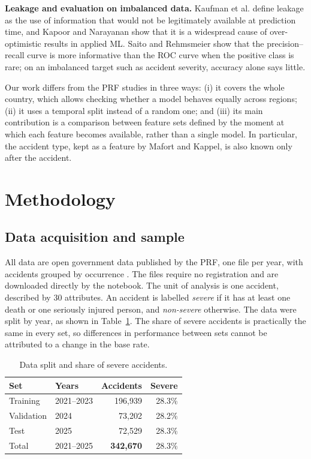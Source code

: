 \documentclass[12pt]{article}
\begin{document}
\textbf{Leakage and evaluation on imbalanced data.} Kaufman et al.
\cite{kaufman2012} define leakage as the use of information that would not be
legitimately available at prediction time, and Kapoor and Narayanan
\cite{kapoor2023} show that it is a widespread cause of over-optimistic results
in applied ML. Saito and Rehmsmeier \cite{saito2015} show that the
precision--recall curve is more informative than the ROC curve when the
positive class is rare; on an imbalanced target such as accident severity,
accuracy alone says little.

Our work differs from the PRF studies in three ways: (i) it covers the whole
country, which allows checking whether a model behaves equally across regions;
(ii) it uses a temporal split instead of a random one; and (iii) its main
contribution is a comparison between feature sets defined by the moment at
which each feature becomes available, rather than a single model. In
particular, the accident type, kept as a feature by Mafort and Kappel, is also
known only after the accident.

\section{Methodology}

\subsection{Data acquisition and sample}

All data are open government data published by the PRF, one file per year,
with accidents grouped by occurrence \cite{prf2026}. The files require no registration and are downloaded
directly by the notebook. The unit of analysis is one accident, described by
30 attributes. An accident is labelled \emph{severe} if it has at least one
death or one seriously injured person, and \emph{non-severe} otherwise. The
data were split by year, as shown in Table~\ref{tab:sample}. The share of
severe accidents is practically the same in every set, so differences in
performance between sets cannot be attributed to a change in the base rate.

\begin{table}[ht]
\centering
\caption{Data split and share of severe accidents.}
\label{tab:sample}
\begin{tabular}{llrr}
\toprule
Set & Years & Accidents & Severe \\
\midrule
Training   & 2021--2023 & 196,939 & 28.3\% \\
Validation & 2024       &  73,202 & 28.2\% \\
Test       & 2025       &  72,529 & 28.3\% \\
\midrule
Total      & 2021--2025 & \textbf{342,670} & 28.3\% \\
\bottomrule
\end{tabular}
\end{table}
\end{document}
